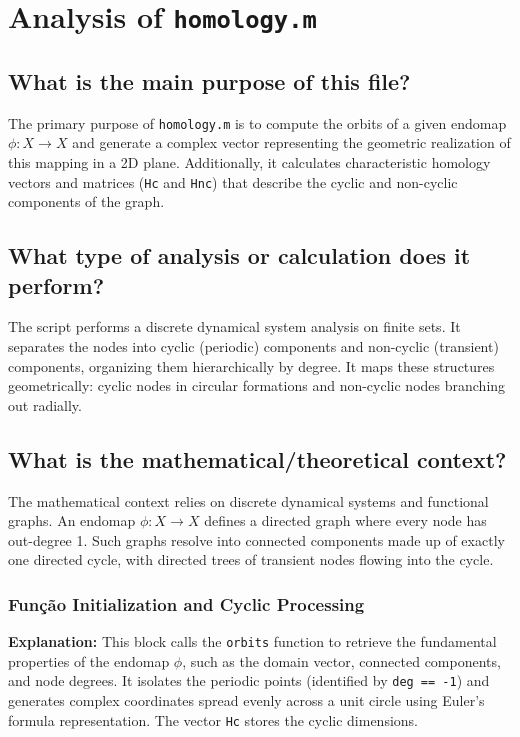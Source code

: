 
\chapter{Analysis of \texttt{homology.m}}

\section{What is the main purpose of this file?}
The primary purpose of \texttt{homology.m} is to compute the orbits of a given endomap $\phi : X \to X$ and generate a complex vector representing the geometric realization of this mapping in a 2D plane. Additionally, it calculates characteristic homology vectors and matrices (\texttt{Hc} and \texttt{Hnc}) that describe the cyclic and non-cyclic components of the graph. 

\section{What type of analysis or calculation does it perform?}
The script performs a discrete dynamical system analysis on finite sets. It separates the nodes into cyclic (periodic) components and non-cyclic (transient) components, organizing them hierarchically by degree. It maps these structures geometrically: cyclic nodes in circular formations and non-cyclic nodes branching out radially.

\section{What is the mathematical/theoretical context?}
The mathematical context relies on discrete dynamical systems and functional graphs. An endomap $\phi: X \to X$ defines a directed graph where every node has out-degree 1. Such graphs resolve into connected components made up of exactly one directed cycle, with directed trees of transient nodes flowing into the cycle. 

\subsection{Função Initialization and Cyclic Processing}
\textbf{Explanation:} 
This block calls the \texttt{orbits} function to retrieve the fundamental properties of the endomap $\phi$, such as the domain vector, connected components, and node degrees. It isolates the periodic points (identified by \texttt{deg == -1}) and generates complex coordinates spread evenly across a unit circle using Euler's formula representation. The vector \texttt{Hc} stores the cyclic dimensions.

